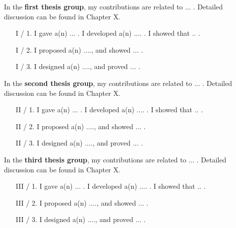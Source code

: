 \documentclass{article}
\begin{document}
\vspace*{1em}

In the \textbf {first thesis group}, my contributions are related to ... . Detailed discussion can be found in Chapter X.
\vspace*{1em}
\begin{enumerate}[wide = 0pt, widest = {I/4.}, leftmargin =*]
    \item [I / 1.] I gave a(n) ... . I developed a(n) .... . 
    I showed that .. .
    
    \item [I / 2.] I proposed a(n) ...., and showed ... .
    
    \item [I / 3.] I designed a(n) ...., and proved ... .

\end{enumerate}

\vspace*{1em}
\noindent

In the \textbf {second thesis group}, my contributions are related to ... . Detailed discussion can be found in Chapter X.
\vspace*{1em}
\begin{enumerate}[wide = 0pt, widest = {II/5.}, leftmargin =*]
    \item [II / 1.] I gave a(n) ... . I developed a(n) .... . 
    I showed that .. .
    
    \item [II / 2.] I proposed a(n) ...., and showed ... .
    
    \item [II / 3.] I designed a(n) ...., and proved ... .
\end{enumerate}

\vspace*{1em}
\noindent

In the \textbf {third thesis group}, my contributions are related to ... . Detailed discussion can be found in Chapter X.

\begin{enumerate}[wide = 0pt, widest = {III/5.}, leftmargin =*]
    \item [III / 1.] I gave a(n) ... . I developed a(n) .... . 
    I showed that .. .
    
    \item [III / 2.] I proposed a(n) ...., and showed ... .
    
    \item [III / 3.] I designed a(n) ...., and proved ... .
\end{enumerate}
\end{document}
